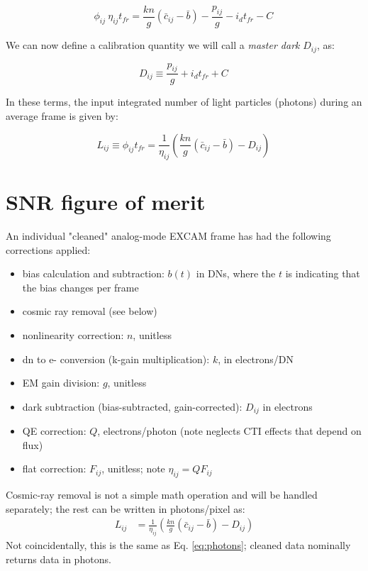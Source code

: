 \documentclass{article}
\begin{document}
\begin{equation}
\phi_{ij}\ \eta_{ij} t_{fr} = \frac{k n}{g} (\bar{c}_{ij}- \bar{b}) - \frac{p_{ij}}{g} - i_d t_{fr} - C \,
\end{equation}

We can now define a calibration quantity we will call a  \emph{master dark} $D_{ij}$, as:

\begin{equation}
D_{ij} \equiv  \frac{p_{ij}}{g} + i_d t_{fr} + C \,
\end{equation}

In these terms, the input integrated number of light particles (photons) during an average frame is given by:

\begin{equation}
\label{eq:photons}
L_{ij} \equiv \phi_{ij} t_{fr} = \frac{1}{\eta_{ij}}\left(  \frac{k n}{g} (\bar{c}_{ij} - \bar{b}) - D_{ij} \right) \,
\end{equation}



\section{SNR figure of merit}

\noindent An individual "cleaned" analog-mode EXCAM frame has had the following corrections applied:
\begin{itemize}
\item bias calculation and subtraction: $b(t)$ in DNs, where the $t$ is indicating that the bias changes per frame
\item cosmic ray removal (see below)
\item nonlinearity correction: $n$, unitless
\item dn to e- conversion (k-gain multiplication): $k$, in electrons/DN
\item EM gain division: $g$, unitless
\item dark subtraction (bias-subtracted, gain-corrected): $D_{ij}$ in electrons
\item QE correction: $Q$, electrons/photon (note neglects CTI effects that depend on flux)
\item flat correction: $F_{ij}$, unitless; note $\eta_{ij} = Q F_{ij}$
\end{itemize}
Cosmic-ray removal is not a simple math operation and will be handled separately; the rest can be written in photons/pixel as:
\begin{align}
\label{eq:signal}
    L_{ij} &= \frac{1}{\eta_{ij}}\left(\frac{k n}{g} (\bar{c}_{ij} - \bar{b}) - D_{ij}\right)
\end{align}
Not coincidentally, this is the same as Eq. \ref{eq:photons}; cleaned data nominally returns data in photons.
\end{document}
